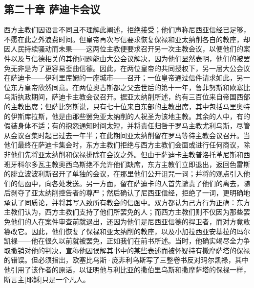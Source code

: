 \par


\subsection{第二十章 萨迪卡会议}

西方主教们因语言不同且不理解此阐述，拒绝接受；他们声称尼西亚信经已足够，不愿在此之外浪费时间。但皇帝再次写信要求恢复保禄和亚太纳削各自的教座，却因人民持续骚动而未果——这两位主教便要求召开另一次主教会议，以便他们的案件以及与信德相关的其他问题能由大公会议解决，因为他们显然表明，他们的被罢免无非是为了更容易歪曲信德。因此，在两位皇帝的共同授权下，另一届大公会议在萨迪卡——伊利里库姆的一座城市——召开；一位皇帝通过信件请求如此，另一位东方皇帝欣然同意。在两位奥古斯都之父去世后的第十一年，鲁菲努斯和欧塞比乌斯执政期间，萨迪卡主教会议召开。据亚太纳削所述，约有三百位来自帝国西部的主教出席；但萨比努斯说，只有七十位来自东部的主教出席，其中包括马里奥特的伊斯库拉斯，他是由那些罢免亚太纳削的人祝圣为该地主教。其余的人中，有的假装身体不适；有的抱怨通知时间太短，并将责任归咎于罗马主教尤利乌斯，尽管从会议召集时起已过去一年半；在此期间亚太纳削留在罗马等待主教会议召开。当他们最终在萨迪卡集会时，东方主教们拒绝与西方主教们会面或进行任何商议，除非他们先将亚太纳削和保禄排除在会议之外。但由于萨迪卡主教普洛托革尼斯和西班牙科尔多瓦主教奥西乌斯绝不允许他们缺席，东方主教们立即退出，返回色雷斯的腓立波波利斯召开了单独的会议，在那里他们公开诅咒一词；并将的观点引入他们的信函中，向各处发送。另一方面，留在萨迪卡的人首先谴责了他们的离去，随后剥夺了亚太纳削控告者的尊严；然后确认了尼西亚信经，拒绝了一词，更明确地承认了同质论，并将其写入致所有教会的信函中。双方都认为己方行为正确：东方主教们认为，西方主教们支持了他们所罢免的人；而西方主教们则不仅因为那些罢免他们的人在案件审查前就退出，还因为他们是尼西亚信德的捍卫者，而对方竟敢篡改它。因此，他们恢复了保禄和亚太纳削的教座，以及小加拉西亚安基拉的玛尔凯禄——他在很久以前就被罢免，正如我们在前书所述。当时，他确实竭尽全力争取撤销对他的判决，宣称他因误解其书中的某些表述而被怀疑持有撒摩萨塔的保禄的错误。但必须指出，欧塞比乌斯·庞非利乌斯写了三整卷书反对玛尔凯禄，其中他引用了该作者的原话，以证明他与利比亚的撒伯里乌斯和撒摩萨塔的保禄一样，断言主[耶稣]只是一个凡人。\par


